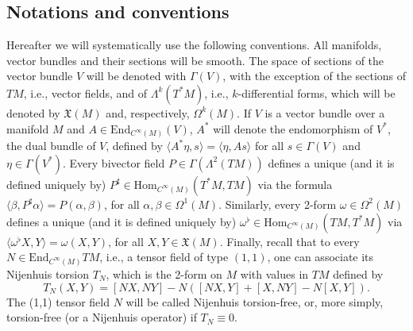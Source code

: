 \documentclass[12pt]{article}
\begin{document}
\subsection{Notations and conventions} Hereafter we will systematically use the following conventions. All manifolds, 
vector bundles and their sections will be smooth.  The space of sections of the vector bundle $V$ will be denoted with $\Gamma(V)$, with the exception of the sections of $TM$, i.e., vector fields, and of $\Lambda^k(T^\ast M)$, i.e., $k$-differential forms, which will be denoted by $\mathfrak X(M)$ and, respectively, $\Omega^k(M)$. If $V$ is a vector bundle over a manifold $M$ and $A\in\text{End}_{C^\infty(M)}(V)$, $A^\ast$ will denote the endomorphism of $V^\ast$, the dual bundle of $V$, defined by $\langle A^\ast\eta,s\rangle=\langle\eta, A s\rangle$ for all $s\in\Gamma(V)$ and $\eta\in\Gamma(V^\ast)$. 
Every bivector field $P\in\Gamma(\Lambda^2(TM))$ defines a unique (and it is defined uniquely by) $P^\sharp\in\text{Hom}_{C^\infty(M)}(T^\ast M,TM)$ via the  
formula $\langle\beta,P^\sharp\alpha\rangle=P(\alpha,\beta)$, for all $\alpha,\beta\in\Omega^1(M)$. Similarly, every 2-form $\omega\in\Omega^2(M)$ defines a unique (and it is defined uniquely by) $\omega^\flat\in \text{Hom}_{C^\infty(M)}(TM,T^\ast M)$ via $\langle\omega^\flat X,Y\rangle=\omega(X,Y)$, for all $X,Y\in\mathfrak X(M)$. Finally, recall that to every $N\in\text{End}_{C^\infty(M)}TM$, i.e., a tensor field of type $(1,1)$, one can associate its Nijenhuis torsion $T_N$, which is the 2-form on $M$ with values in $TM$ defined by 
\begin{equation}
T_N(X,Y)=[NX,NY]-N([NX,Y]+[X,NY]-N[X,Y]).\label{eq:torsionA}
\end{equation}
The (1,1) tensor field $N$ will be called Nijenhuis torsion-free, or, more simply, torsion-free (or a Nijenhuis operator) 
if $T_N\equiv 0$.
\end{document}
